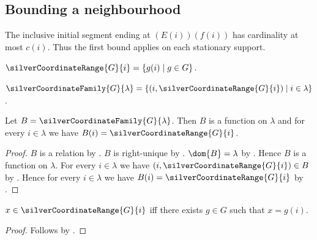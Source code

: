 \subsection{Bounding a neighbourhood}

The inclusive initial segment ending at $(E(i))(f(i))$ has cardinality
at most $c(i)$. Thus the first bound applies on each stationary support.

\begin{definition}\label{silver_coordinate_range}
    $\silverCoordinateRange{G}{i}=\{g(i)\mid g\in G\}$.
\end{definition}

\begin{definition}\label{silver_coordinate_family}
    $\silverCoordinateFamily{G}{\lambda}
        =\{(i,\silverCoordinateRange{G}{i})\mid i\in\lambda\}$.
\end{definition}

\begin{proposition}\label{silver_coordinate_family_type}
    Let $B=\silverCoordinateFamily{G}{\lambda}$.
    Then $B$ is a function on $\lambda$ and
        for every $i\in\lambda$ we have
            $B(i)=\silverCoordinateRange{G}{i}$.
\end{proposition}
\begin{proof}
    $B$ is a relation by .
    $B$ is right-unique
        by .
    $\dom{B}=\lambda$
        by .
    Hence $B$ is a function on $\lambda$.
    For every $i\in\lambda$ we have
        $(i,\silverCoordinateRange{G}{i})\in B$
        by .
    Hence for every $i\in\lambda$ we have
        $B(i)=\silverCoordinateRange{G}{i}$
        by .
\end{proof}

\begin{proposition}\label{silver_coordinate_range_iff}
    $x\in\silverCoordinateRange{G}{i}$ iff
        there exists $g\in G$ such that $x=g(i)$.
\end{proposition}
\begin{proof}
    Follows by .
\end{proof}

